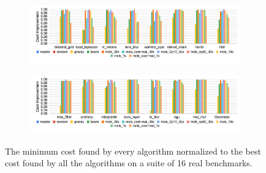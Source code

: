 \begin{figure}[!t]
    \centering
    \begin{subfigure}[t]{\textwidth}
        \centering
        \includegraphics[trim={0cm 4.5cm 0cm 0cm},clip,width=\textwidth]{figures/cost1.png}
    \end{subfigure}
    \begin{subfigure}[t]{\textwidth}
        \centering
        \includegraphics[width=\textwidth]{figures/cost2.png}
    \end{subfigure}
    \caption{The minimum cost found by every algorithm normalized to the best cost found by all the algorithms on a suite of 16 real benchmarks.}
    \label{fig:cost}
\end{figure}
